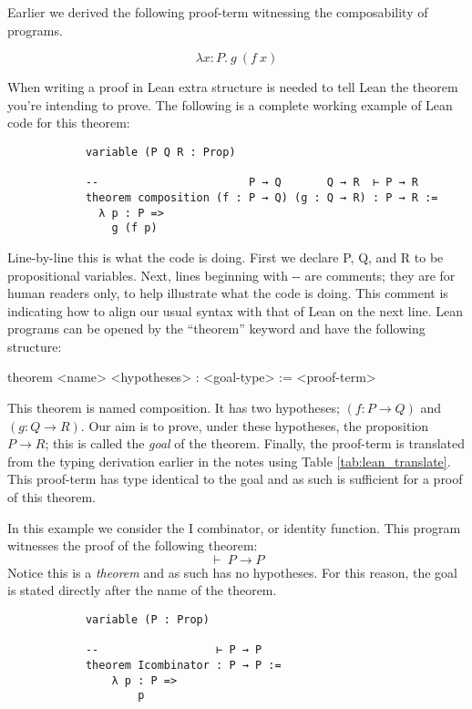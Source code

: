 \documentclass{book}
\begin{document}
    \begin{eg}

        Earlier we derived the following proof-term witnessing the composability of programs.

        $$ \lambda x : P. \ g \ (f \ x) $$

        When writing a proof in Lean extra structure is needed to tell Lean the theorem you're intending to prove. The following is a complete working example of Lean code for this theorem: 

        \begin{lstlisting}
            variable (P Q R : Prop)
    
            --                       P → Q       Q → R  ⊢ P → R
            theorem composition (f : P → Q) (g : Q → R) : P → R :=
              λ p : P =>
                g (f p)
        \end{lstlisting}
    
        Line-by-line this is what the code is doing. First we declare P, Q, and R to be propositional variables. Next, lines beginning with -{}- are comments; they are for human readers only, to help illustrate what the code is doing. This comment is indicating how to align our usual syntax with that of Lean on the next line. Lean programs can be opened by the ``theorem'' keyword and have the following structure:
        
        \begin{center}
            theorem <name> <hypotheses> : <goal-type> := 
                <proof-term>
        \end{center}

        This theorem is named composition. It has two hypotheses; $(f : P \to Q)$ and $(g : Q \to R)$. Our aim is to prove, under these hypotheses, the proposition $P \to R$; this is called the \emph{goal} of the theorem. Finally, the proof-term is translated from the typing derivation earlier in the notes using Table \ref{tab:lean_translate}. This proof-term has type identical to the goal and as such is sufficient for a proof of this theorem. 

    \end{eg}

    \begin{eg} [I Combinator]

        In this example we consider the I combinator, or identity function. This program witnesses the proof of the following theorem: $$ \vdash \ P \to P$$
        Notice this is a \emph{theorem} and as such has no hypotheses. For this reason, the goal is stated directly after the name of the theorem.

        \begin{lstlisting}
            variable (P : Prop)
            
            --                  ⊢ P → P
            theorem Icombinator : P → P :=
                λ p : P =>
                    p
        \end{lstlisting}  
        
    \end{eg}
\end{document}
